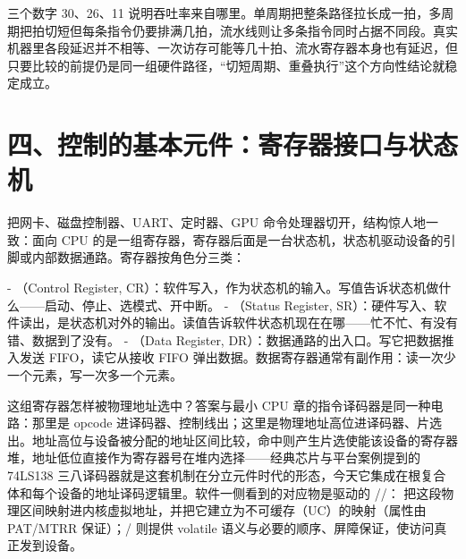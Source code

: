 三个数字 30、26、11 说明吞吐率来自哪里。单周期把整条路径拉长成一拍，多周期把拍切短但每条指令仍要排满几拍，流水线则让多条指令同时占据不同段。真实机器里各段延迟并不相等、一次访存可能等几十拍、流水寄存器本身也有延迟，但只要比较的前提仍是同一组硬件路径，“切短周期、重叠执行”这个方向性结论就稳定成立。

\section{四、控制的基本元件：寄存器接口与状态机}


把网卡、磁盘控制器、UART、定时器、GPU 命令处理器切开，结构惊人地一致：面向 CPU 的是一组寄存器，寄存器后面是一台状态机，状态机驱动设备的引脚或内部数据通路。寄存器按角色分三类：

- （Control Register, CR）：软件写入，作为状态机的输入。写值告诉状态机做什么——启动、停止、选模式、开中断。
- （Status Register, SR）：硬件写入、软件读出，是状态机对外的输出。读值告诉软件状态机现在在哪——忙不忙、有没有错、数据到了没有。
- （Data Register, DR）：数据通路的出入口。写它把数据推入发送 FIFO，读它从接收 FIFO 弹出数据。数据寄存器通常有副作用：读一次少一个元素，写一次多一个元素。

这组寄存器怎样被物理地址选中？答案与最小 CPU 章的指令译码器是同一种电路：那里是 opcode 进译码器、控制线出；这里是物理地址高位进译码器、片选出。地址高位与设备被分配的地址区间比较，命中则产生片选使能该设备的寄存器堆，地址低位直接作为寄存器号在堆内选择——经典芯片与平台案例提到的 74LS138 三八译码器就是这套机制在分立元件时代的形态，今天它集成在根复合体和每个设备的地址译码逻辑里。软件一侧看到的对应物是驱动的 //： 把这段物理区间映射进内核虚拟地址，并把它建立为不可缓存（UC）的映射（属性由 PAT/MTRR 保证）；/ 则提供 volatile 语义与必要的顺序、屏障保证，使访问真正发到设备。

